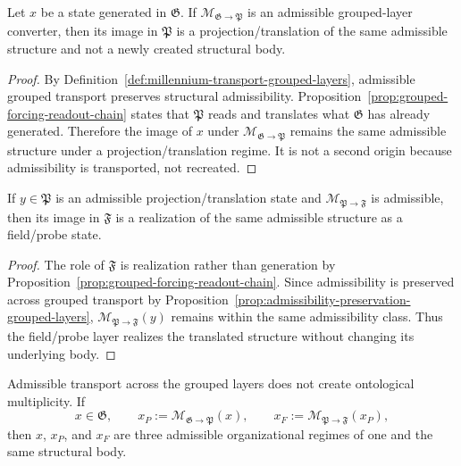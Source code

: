 \begin{lemma}
\label{lem:group-transport}
Let $x$ be a state generated in $\mathfrak G$. If $\mathcal M_{\mathfrak G\to\mathfrak P}$
is an admissible grouped-layer converter, then its image in $\mathfrak P$ is a
projection/translation of the same admissible structure and not a newly created
structural body.
\end{lemma}

\begin{proof}
By Definition~\ref{def:millennium-transport-grouped-layers}, admissible grouped
transport preserves structural admissibility. Proposition~\ref{prop:grouped-forcing-readout-chain}
states that $\mathfrak P$ reads and translates what $\mathfrak G$ has already
generated. Therefore the image of $x$ under $\mathcal M_{\mathfrak G\to\mathfrak P}$
remains the same admissible structure under a projection/translation regime.
It is not a second origin because admissibility is transported, not recreated.
\end{proof}

\begin{lemma}
\label{lem:group-realization}
If $y\in\mathfrak P$ is an admissible projection/translation state and
$\mathcal M_{\mathfrak P\to\mathfrak F}$ is admissible, then its image in
$\mathfrak F$ is a realization of the same admissible structure as a field/probe
state.
\end{lemma}

\begin{proof}
The role of $\mathfrak F$ is realization rather than generation by
Proposition~\ref{prop:grouped-forcing-readout-chain}. Since admissibility is
preserved across grouped transport by Proposition~\ref{prop:admissibility-preservation-grouped-layers},
$\mathcal M_{\mathfrak P\to\mathfrak F}(y)$ remains within the same
admissibility class. Thus the field/probe layer realizes the translated
structure without changing its underlying body.
\end{proof}

\begin{proposition}
\label{prop:no-ontology-drift}
Admissible transport across the grouped layers does not create ontological
multiplicity. If
\[
x \in \mathfrak G,
\qquad
x_P := \mathcal M_{\mathfrak G\to\mathfrak P}(x),
\qquad
x_F := \mathcal M_{\mathfrak P\to\mathfrak F}(x_P),
\]
then $x$, $x_P$, and $x_F$ are three admissible organizational regimes of one
and the same structural body.
\end{proposition}

